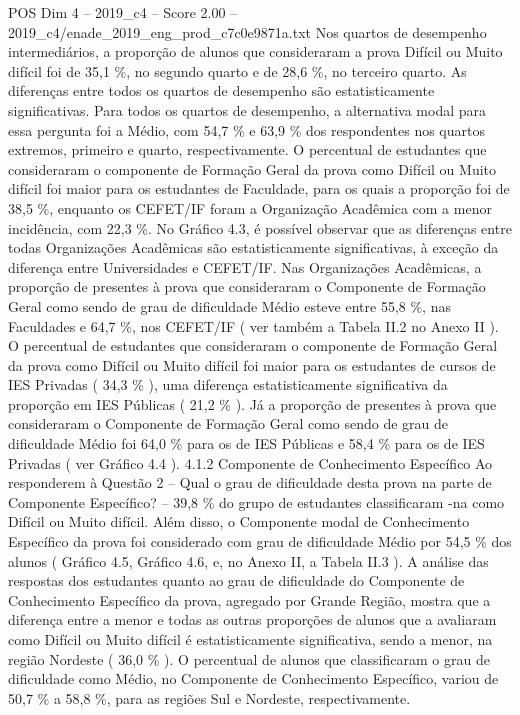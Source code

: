 \begin{textsample}{POS Dim 4 – 2019\_c4 – Score 2.00 – 2019\_c4/enade\_2019\_eng\_prod\_c7c0e9871a.txt}
Nos quartos de desempenho intermediários, a proporção de alunos que consideraram a prova Difícil ou Muito difícil foi de 35,1 \%, no segundo quarto e de 28,6 \%, no terceiro quarto.
As diferenças entre todos os quartos de desempenho são estatisticamente significativas.
Para todos os quartos de desempenho, a alternativa modal para essa pergunta foi a Médio, com 54,7 \% e 63,9 \% dos respondentes nos quartos extremos, primeiro e quarto, respectivamente.
O percentual de estudantes que consideraram o componente de Formação Geral da prova como Difícil ou Muito difícil foi maior para os estudantes de Faculdade, para os quais a proporção foi de 38,5 \%, enquanto os CEFET/IF foram a Organização Acadêmica com a menor incidência, com 22,3 \%.
No Gráfico 4.3, é possível observar que as diferenças entre todas Organizações Acadêmicas são estatisticamente significativas, à exceção da diferença entre Universidades e CEFET/IF.
Nas Organizações Acadêmicas, a proporção de presentes à prova que consideraram o Componente de Formação Geral como sendo de grau de dificuldade Médio esteve entre 55,8 \%, nas Faculdades e 64,7 \%, nos CEFET/IF ( ver também a Tabela II.2 no Anexo II ).
O percentual de estudantes que consideraram o componente de Formação Geral da prova como Difícil ou Muito difícil foi maior para os estudantes de cursos de IES Privadas ( 34,3 \% ), uma diferença estatisticamente significativa da proporção em IES Públicas ( 21,2 \% ).
Já a proporção de presentes à prova que consideraram o Componente de Formação Geral como sendo de grau de dificuldade Médio foi 64,0 \% para os de IES Públicas e 58,4 \% para os de IES Privadas ( ver Gráfico 4.4 ). 4.1.2 Componente de Conhecimento Específico Ao responderem à Questão 2 – Qual o grau de dificuldade desta prova na parte de Componente Específico? – 39,8 \% do grupo de estudantes classificaram -na como Difícil ou Muito difícil.
Além disso, o Componente modal de Conhecimento Específico da prova foi considerado com grau de dificuldade Médio por 54,5 \% dos alunos ( Gráfico 4.5, Gráfico 4.6, e, no Anexo II, a Tabela II.3 ).
A análise das respostas dos estudantes quanto ao grau de dificuldade do Componente de Conhecimento Específico da prova, agregado por Grande Região, mostra que a diferença entre a menor e todas as outras proporções de alunos que a avaliaram como Difícil ou Muito difícil é estatisticamente significativa, sendo a menor, na região Nordeste ( 36,0 \% ).
O percentual de alunos que classificaram o grau de dificuldade como Médio, no Componente de Conhecimento Específico, variou de 50,7 \% a 58,8 \%, para as regiões Sul e Nordeste, respectivamente.

\end{textsample}
